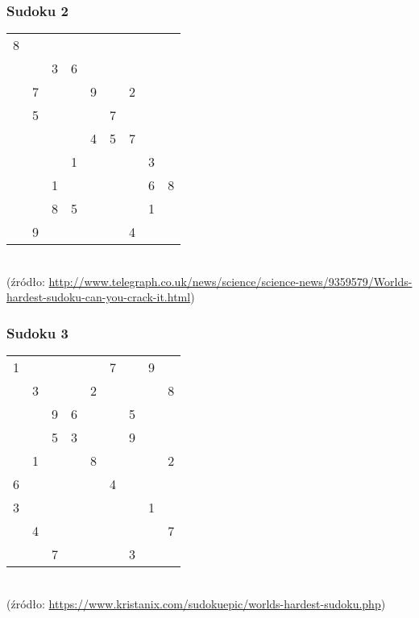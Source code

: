 \subsubsection{Sudoku 2}
    \begin{tabular}{ccc|ccc|ccc}
    8& & & & & & & & \\
    & &3&6& & & & & \\
    &7& & &9& &2& & \\ \hline
    &5& & & &7& & & \\
    & & & &4&5&7& & \\
    & & &1& & & &3& \\ \hline
    & &1& & & & &6&8\\
    & &8&5& & & &1& \\
    &9& & & & &4& & \\
    \end{tabular}\\
    (źródło: \url{http://www.telegraph.co.uk/news/science/science-news/9359579/Worlds-hardest-sudoku-can-you-crack-it.html})\\
    
    \subsubsection{Sudoku 3}
    \begin{tabular}{ccc|ccc|ccc}
    1& & & & &7& &9& \\
    &3& & &2& & & &8\\
    & &9&6& & &5& & \\
    & &5&3& & &9& & \\ \hline
    &1& & &8& & & &2\\
    6& & & & &4& & & \\
    3& & & & & & &1& \\ \hline
    &4& & & & & & &7\\
    & &7& & & &3& & \\

\end{tabular}\\
    (źródło: \url{https://www.kristanix.com/sudokuepic/worlds-hardest-sudoku.php})\\
     
